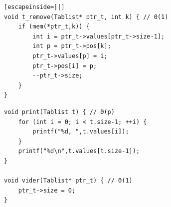 \documentclass[a4paper,12pt,titlepage]{article}
\begin{document}
\begin{fnc*}{}
\begin{verbatim}[escapeinside=||]
void t_remove(Tablist* ptr_t, int k) { // Θ(1)
    if (mem(*ptr_t,k)) {
        int i = ptr_t->values[ptr_t->size-1];
        int p = ptr_t->pos[k];
        ptr_t->values[p] = i;
        ptr_t->pos[i] = p;
        --ptr_t->size;
    }
}
\end{verbatim}
\end{fnc*}
\begin{verbatim}
void print(Tablist t) { // Θ(p)
    for (int i = 0; i < t.size-1; ++i) {
        printf("%d, ",t.values[i]);
    }
    printf("%d\n",t.values[t.size-1]);
}

void vider(Tablist* ptr_t) { // Θ(1)
    ptr_t->size = 0;
}
\end{verbatim}
\end{document}
